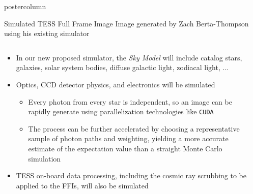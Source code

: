 \documentclass[final,hyperref={pdfpagelabels=false}]{beamer}
\newlength{\columnheight}
\begin{document}
\begin{frame}
\begin{columns}
    \begin{column}{.49\textwidth}
      \begin{beamercolorbox}[center,wd=\textwidth]{postercolumn}
        \begin{minipage}[T]{.95\textwidth}
          \parbox[t][\columnheight]{\textwidth}{
            \begin{block}{Simulated TESS Full Frame Image}
            Image generated by Zach Berta-Thompson using his existing simulator
              \begin{columns}
                \begin{column}{.70\textwidth}
                \begin{itemize}
                    \item In our new proposed simulator, the \emph{Sky Model} will include catalog stars, galaxies, solar system bodies, diffuse galactic light, zodiacal light, ...
                    \vfill
                    \item Optics, CCD detector physics, and electronics will be simulated
                    \begin{itemize}
                    	\item Every photon from every star is independent, so an image can be rapidly generate using parallelization technologies like \texttt{CUDA} 
			\item The process can be further accelerated by choosing a representative sample of photon paths and weighting, yielding a more accurate estimate of the expectation value than a straight Monte Carlo simulation
                    \end{itemize}
                    \vfill
                    \item TESS on-board data processing, including the cosmic ray scrubbing to be applied to the FFIs, will also be simulated
                    \vfill
                \end{itemize}
                \end{column}
                \begin{column}{.28\textwidth}

\end{column}
\end{columns}
\end{block}}
\end{minipage}
\end{beamercolorbox}
\end{column}
\end{columns}
\end{frame}
\end{document}

